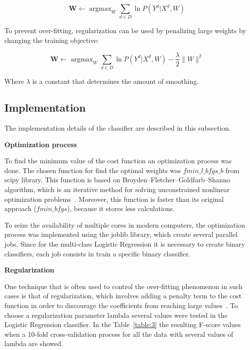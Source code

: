\documentclass[letterpaper,10pt]{article}
\DeclareMathOperator*{\argmax}{argmax}
\theoremstyle{mytheor}
\begin{document}
\begin{equation}
\boldsymbol{W} \leftarrow \argmax_{W} \sum_{d \in D} \ln P(Y^d|X^d, W)
\end{equation}

To prevent over-fitting, regularization can be used by penalizing large weights by changing the training objective:

\begin{equation}
\boldsymbol{W} \leftarrow \argmax_{W} \sum_{d \in D} \ln P(Y^d|X^d, W) - \frac{\lambda}{2}\parallel W \parallel^2 
\end{equation}

Where $\lambda$ is a constant that determines the amount of smoothing. 

\subsection{Implementation}

The implementation details of the classifier are described in this subsection.

\textbf{Optimization process}

To find the minimum value of the cost function an optimization process was done. The chosen function for find the optimal weights was $fmin\_l\_bfgs\_b$ from scipy library. This function is based on Broyden–Fletcher–Goldfarb–Shanno algorithm, which is an iterative method for solving unconstrained nonlinear optimization problems~\cite{wiki:bfgs}. Moreover, this function is faster than its original approach ($fmin\_bfgs$), because it stores less calculations. 

To seize the availability of multiple cores in modern computers, the optimization process was implemented using the joblib library, which create several parallel jobs. Since for the multi-class Logistic Regression it is necessary to create binary classifiers, each job consists in train a specific binary classifier.

\textbf{Regularization} 

One technique that is often used to control the over-fitting phenomenon in such cases is that of regularization, which involves adding a penalty term to the cost function in order to discourage the coefficients from reaching large values~\cite{bishop2007pattern}.
To choose a regularization parameter lambda several values were tested in the Logistic Regression classifier. In the Table~\ref{table:3} the resulting F-score values when a 10-fold cross-validation process for all the data with several values of lambda are showed.
\end{document}
